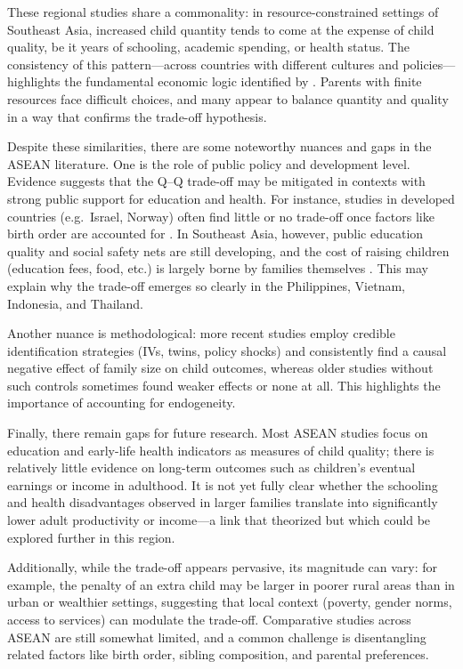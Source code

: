 \documentclass[]{AEA}
\begin{document}
These regional studies share a commonality: in resource-constrained
settings of Southeast Asia, increased child quantity tends to come at
the expense of child quality, be it years of schooling, academic
spending, or health status. The consistency of this pattern---across
countries with different cultures and policies---highlights the
fundamental economic logic identified by \citet{becker1973interaction}.
Parents with finite resources face difficult choices, and many appear to
balance quantity and quality in a way that confirms the trade-off
hypothesis.

Despite these similarities, there are some noteworthy nuances and gaps
in the ASEAN literature. One is the role of public policy and
development level. Evidence suggests that the Q--Q trade-off may be
mitigated in contexts with strong public support for education and
health. For instance, studies in developed countries (e.g.~Israel,
Norway) often find little or no trade-off once factors like birth order
are accounted for
\citep{black2005more, kristensen2010educational, angrist2010multiple}.
In Southeast Asia, however, public education quality and social safety
nets are still developing, and the cost of raising children (education
fees, food, etc.) is largely borne by families themselves
\citep{oecd2024sigi}. This may explain why the trade-off emerges so
clearly in the Philippines, Vietnam, Indonesia, and Thailand.

Another nuance is methodological: more recent studies employ credible
identification strategies (IVs, twins, policy shocks) and consistently
find a causal negative effect of family size on child outcomes, whereas
older studies without such controls sometimes found weaker effects or
none at all. This highlights the importance of accounting for
endogeneity.

Finally, there remain gaps for future research. Most ASEAN studies focus
on education and early-life health indicators as measures of child
quality; there is relatively little evidence on long-term outcomes such
as children's eventual earnings or income in adulthood. It is not yet
fully clear whether the schooling and health disadvantages observed in
larger families translate into significantly lower adult productivity or
income---a link that \citet{becker1976child} theorized but which could
be explored further in this region.

Additionally, while the trade-off appears pervasive, its magnitude can
vary: for example, the penalty of an extra child may be larger in poorer
rural areas than in urban or wealthier settings, suggesting that local
context (poverty, gender norms, access to services) can modulate the
trade-off. Comparative studies across ASEAN are still somewhat limited,
and a common challenge is disentangling related factors like birth
order, sibling composition, and parental preferences.
\end{document}
